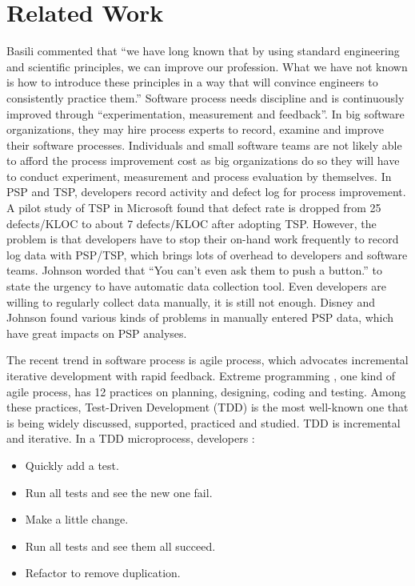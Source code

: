 \documentclass[11pt,twocolumn]{article}
\begin{document}
\section{Related Work}
\label{sec:related}
Basili commented that ``we have long known that by using standard
engineering and scientific principles, we can improve our profession. What
we have not known is how to introduce these principles in a way that will
convince engineers to consistently practice them.'' \cite{Humphrey:99}
Software process needs discipline and is continuously improved through
``experimentation, measurement and feedback''\cite{Humphrey:99}. In big
software organizations, they may hire process experts to record, examine
and improve their software processes. Individuals and small software teams
are not likely able to afford the process improvement cost as big
organizations do so they will have to conduct experiment, measurement and
process evaluation by themselves. In PSP and TSP, developers record
activity and defect log for process improvement. A pilot study of TSP in
Microsoft found that defect rate is dropped from 25 defects/KLOC to about 7
defects/KLOC\cite{MicrosoftTSP} after adopting TSP. However, the problem is
that developers have to stop their on-hand work frequently to record log
data with PSP/TSP, which brings lots of overhead to developers and software
teams.  Johnson worded that ``You can't even ask them to push a
button.''\cite{csdl2-01-12} to state the urgency to have automatic data
collection tool. Even developers are willing to regularly collect data
manually, it is still not enough. Disney and Johnson found various kinds of
problems in manually entered PSP data\cite{Disney98a}, which have great
impacts on PSP analyses.

The recent trend in software process is agile process, which advocates
incremental iterative development with rapid feedback. Extreme programming
\cite{Beck:00}, one kind of agile process, has 12 practices on planning,
designing, coding and testing. Among these practices, Test-Driven
Development (TDD) is the most well-known one that is being widely
discussed\cite{TddYahooGroup}, supported\cite{Junit,HttpUnit,MockObject},
practiced\cite{TestDrivenWeb,GaryPollice:03,ObjectMentorTDD} and
studied\cite{Muller:02,George:04,Olan:03,Edwards:04}. TDD is incremental
and iterative. In a TDD microprocess, developers \cite{Beck:03}:
\begin{itemize}
\item {Quickly add a test.}
\item {Run all tests and see the new one fail.}
\item {Make a little change.}
\item {Run all tests and see them all succeed.}
\item {Refactor to remove duplication.}
\end{itemize}
\end{document}
